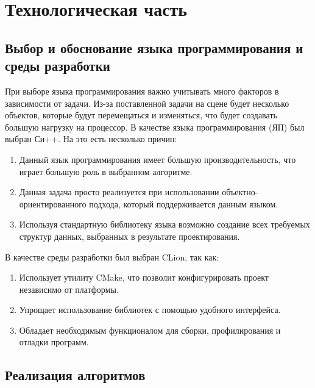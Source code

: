 \chapter{Технологическая часть}
\section{Выбор и обоснование языка программирования и среды разработки}
При выборе языка программирования важно учитывать много факторов в 
зависимости от задачи. Из-за поставленной задачи на сцене будет несколько объектов, которые будут
перемещаться и изменяться, что будет создавать большую нагрузку на процессор.
В качестве языка программирования (ЯП) был выбран Си++. На это есть 
несколько причин:
\begin{enumerate}
    \item Данный язык программирования имеет большую производительность, что играет большую роль в выбранном алгоритме.
    \item Данная задача просто реализуется при использовании объектно-ориентированного подхода, который поддерживается данным языком.
    \item Используя стандартную библиотеку языка возможно создание всех требуемых структур данных, выбранных в результате проектирования.
\end{enumerate}
В качестве среды разработки был выбран CLion, так как:
\begin{enumerate}
    \item Использует утилиту CMake, что позволит конфигурировать проект независимо от платформы.
    \item Упрощает использование библиотек с помощью удобного интерфейса.
    \item Обладает необходимым функционалом для сборки, профилирования и отладки программ.
\end{enumerate}

\section{Реализация алгоритмов}
\begin{lstlisting}
    
\end{lstlisting}